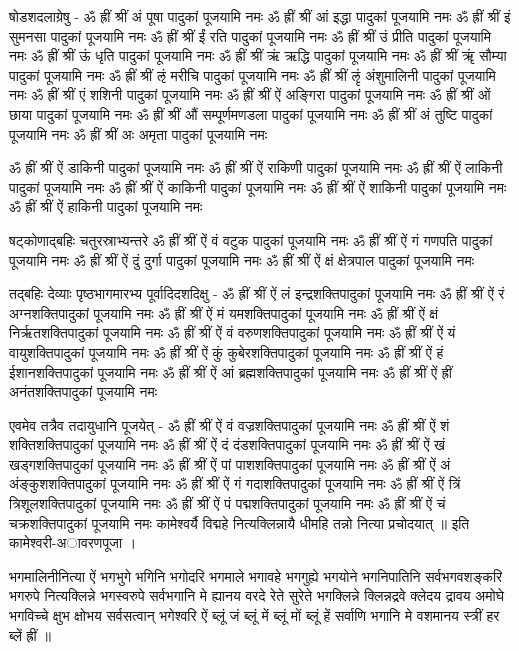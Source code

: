 षोडशदलाग्रेषु -
ॐ ह्रीं श्रीं अं पूषा पादुकां पूजयामि नमः
ॐ ह्रीं श्रीं आं इद्धा पादुकां पूजयामि नमः
ॐ ह्रीं श्रीं इं सुमनसा पादुकां पूजयामि नमः
ॐ ह्रीं श्रीं ईं रति पादुकां पूजयामि नमः
ॐ ह्रीं श्रीं उं प्रीति पादुकां पूजयामि नमः
ॐ ह्रीं श्रीं ऊं धृति पादुकां पूजयामि नमः
ॐ ह्रीं श्रीं ऋं ऋद्धि पादुकां पूजयामि नमः
ॐ ह्रीं श्रीं ॠं सौम्या पादुकां पूजयामि नमः
ॐ ह्रीं श्रीं ऌं मरीचि पादुकां पूजयामि नमः
ॐ ह्रीं श्रीं ऌृं अंशुमालिनी पादुकां पूजयामि नमः
ॐ ह्रीं श्रीं एं शशिनी पादुकां पूजयामि नमः
ॐ ह्रीं श्रीं ऐं अङ्गिरा पादुकां पूजयामि नमः
ॐ ह्रीं श्रीं ओं छाया पादुकां पूजयामि नमः
ॐ ह्रीं श्रीं औं सम्पूर्णमणडला पादुकां पूजयामि नमः
ॐ ह्रीं श्रीं अं तुष्टि पादुकां पूजयामि नमः
ॐ ह्रीं श्रीं अः अमृता पादुकां पूजयामि नमः

ॐ ह्रीं श्रीं ऐं डाकिनी पादुकां पूजयामि नमः
ॐ ह्रीं श्रीं ऐं राकिणी पादुकां पूजयामि नमः
ॐ ह्रीं श्रीं ऐं लाकिनी पादुकां पूजयामि नमः
ॐ ह्रीं श्रीं ऐं काकिनी पादुकां पूजयामि नमः
ॐ ह्रीं श्रीं ऐं शाकिनी पादुकां पूजयामि नमः
ॐ ह्रीं श्रीं ऐं हाकिनी पादुकां पूजयामि नमः

षट्कोणाद्बहिः चतुरस्राभ्यन्तरे 
ॐ ह्रीं श्रीं ऐं वं वटुक पादुकां पूजयामि नमः
ॐ ह्रीं श्रीं ऐं गं गणपति पादुकां पूजयामि नमः
ॐ ह्रीं श्रीं ऐं दुं दुर्गा पादुकां पूजयामि नमः
ॐ ह्रीं श्रीं ऐं क्षं क्षेत्रपाल पादुकां पूजयामि नमः

तद्बहिः देव्याः पृष्ठभागमारभ्य पूर्वादिदशदिक्षु -
ॐ ह्रीं श्रीं ऐं लं इन्द्रशक्तिपादुकां पूजयामि नमः
ॐ ह्रीं श्रीं ऐं रं अग्नशक्तिपादुकां पूजयामि नमः
ॐ ह्रीं श्रीं ऐं मं यमशक्तिपादुकां पूजयामि नमः
ॐ ह्रीं श्रीं ऐं क्षं निर्ऋतशक्तिपादुकां पूजयामि नमः
ॐ ह्रीं श्रीं ऐं वं वरुणशक्तिपादुकां पूजयामि नमः
ॐ ह्रीं श्रीं ऐं यं वायुशक्तिपादुकां पूजयामि नमः
ॐ ह्रीं श्रीं ऐं कुं कुबेरशक्तिपादुकां पूजयामि नमः
ॐ ह्रीं श्रीं ऐं हं ईशानशक्तिपादुकां पूजयामि नमः
ॐ ह्रीं श्रीं ऐं आं ब्रह्मशक्तिपादुकां पूजयामि नमः
ॐ ह्रीं श्रीं ऐं ह्रीं अनंतशक्तिपादुकां पूजयामि नमः

एवमेव तत्रैव तदायुधानि पूजयेत् -
ॐ ह्रीं श्रीं ऐं वं वज्रशक्तिपादुकां पूजयामि नमः
ॐ ह्रीं श्रीं ऐं शं शक्तिशक्तिपादुकां पूजयामि नमः
ॐ ह्रीं श्रीं ऐं दं दंडशक्तिपादुकां पूजयामि नमः
ॐ ह्रीं श्रीं ऐं खं खड्गशक्तिपादुकां पूजयामि नमः
ॐ ह्रीं श्रीं ऐं पां पाशशक्तिपादुकां पूजयामि नमः
ॐ ह्रीं श्रीं ऐं अं अंङ्कुशशक्तिपादुकां पूजयामि नमः
ॐ ह्रीं श्रीं ऐं गं गदाशक्तिपादुकां पूजयामि नमः
ॐ ह्रीं श्रीं ऐं त्रिं त्रिशूलशक्तिपादुकां पूजयामि नमः
ॐ ह्रीं श्रीं ऐं पं पद्मशक्तिपादुकां पूजयामि नमः
ॐ ह्रीं श्रीं ऐं चं चक्रशक्तिपादुकां पूजयामि नमः
कामेश्वर्यै विद्महे नित्यक्लिन्नायै धीमहि तन्नो नित्या प्रचोदयात् ॥
इति कामेश्वरी-अावरणपूजा ।

भगमालिनीनित्या 
ऐं भगभुगे भगिनि भगोदरि भगमाले भगावहे भगगुह्ये भगयोने भगनिपातिनि सर्वभगवशङ्करि भगरुपे नित्यक्लिन्ने भगस्वरुपे सर्वभगानि मे ह्यानय वरदे रेते सुरेते भगक्लिन्ने क्लिन्नद्रवे क्लेदय द्रावय अमोघे भगविच्चे क्षुभ क्षोभय सर्वसत्वान् भगेश्वरि ऐं ब्लूं जं ब्लूं में ब्लूं मों ब्लूं हें सर्वाणि भगानि मे वशमानय स्त्रीं हर ब्लें ह्रीं ॥


